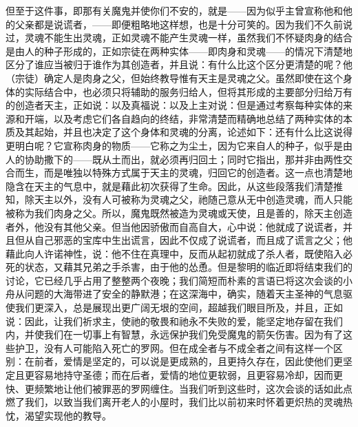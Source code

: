 但至于这件事，即那有关魔鬼并使你们不安的，就是——因为似乎主曾宣称他和他的父亲都是说谎者，——即便粗略地这样想，也是十分可笑的。因为我们不久前说过，灵魂不能生出灵魂，正如灵魂不能产生灵魂一样，虽然我们不怀疑肉身的结合是由人的种子形成的，正如宗徒在两种实体——即肉身和灵魂——的情况下清楚地区分了谁应当被归于谁作为其创造者，并且说：有什么比这个区分更清楚的呢？他（宗徒）确定人是肉身之父，但始终教导惟有天主是灵魂之父。虽然即使在这个身体的实际结合中，也必须只将辅助的服务归给人，但将其形成的主要部分归给万有的创造者天主，正如说：以及真福说：以及上主对说：但是通过考察每种实体的来源和开端，以及考虑它们各自趋向的终结，非常清楚而精确地总结了两种实体的本质及其起始，并且也决定了这个身体和灵魂的分离，论述如下：还有什么比这说得更明白呢？它宣称肉身的物质——它称之为尘土，因为它来自人的种子，似乎是由人的协助撒下的——既从土而出，就必须再归回土；同时它指出，那并非由两性交合而生，而是唯独以特殊方式属于天主的灵魂，归回它的创造者。这一点也清楚地隐含在天主的气息中，就是藉此初次获得了生命。因此，从这些段落我们清楚推知，除天主以外，没有人可被称为灵魂之父，祂随己意从无中创造灵魂，而人只能被称为我们肉身之父。所以，魔鬼既然被造为灵魂或天使，且是善的，除天主创造者外，他没有其他父亲。但当他因骄傲而自高自大，心中说：他就成了说谎者，并且但从自己邪恶的宝库中生出谎言，因此不仅成了说谎者，而且成了谎言之父；他藉此向人许诺神性，说：他不住在真理中，反而从起初就成了杀人者，既使陷入必死的状态，又藉其兄弟之手杀害，由于他的怂恿。但是黎明的临近即将结束我们的讨论，它已经几乎占用了整整两个夜晚；我们简短而朴素的言语已将这次会谈的小舟从问题的大海带进了安全的静默港；在这深海中，确实，随着天主圣神的气息驱使我们更深入，总是展现出更广阔无垠的空间，超越我们眼目所及，并且，正如说：因此，让我们祈求主，使祂的敬畏和祂永不失败的爱，能坚定地存留在我们内，并使我们在一切事上有智慧，永远保护我们免受魔鬼的箭矢伤害。因为有了这些护卫，没有人可能陷入死亡的罗网。但在成全者与不成全者之间有这样一个区别：在前者，爱情是坚定的，可以说是更成熟的，且更持久存在，因此使他们更坚定且更容易地持守圣德；而在后者，爱情的地位更软弱，且更容易冷却，因而更快、更频繁地让他们被罪恶的罗网缠住。当我们听到这些时，这次会谈的话如此点燃了我们，以致当我们离开老人的小屋时，我们比以前初来时怀着更炽热的灵魂热忱，渴望实现他的教导。\par

